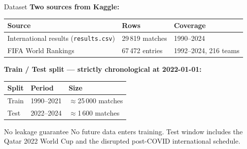 \documentclass[10pt,aspectratio=169]{beamer}
\begin{document}
\begin{frame}{Dataset}
  \textbf{Two sources from Kaggle:}

  \medskip
  \begin{center}
    \begin{tabular}{lll}
      \toprule
      \textbf{Source} & \textbf{Rows} & \textbf{Coverage} \\
      \midrule
      International results (\texttt{results.csv}) & 29\,819 matches & 1990--2024 \\
      FIFA World Rankings & 67\,472 entries & 1992--2024, 216 teams \\
      \bottomrule
    \end{tabular}
  \end{center}

  \medskip
  \textbf{Train / Test split --- strictly chronological at 2022-01-01:}

  \begin{center}
    \begin{tabular}{lll}
      \toprule
      \textbf{Split} & \textbf{Period} & \textbf{Size} \\
      \midrule
      Train & 1990--2021 & $\approx$25\,000 matches \\
      Test  & 2022--2024 & $\approx$1\,600 matches \\
      \bottomrule
    \end{tabular}
  \end{center}

  \begin{alertblock}{No leakage guarantee}
    No future data enters training. Test window includes the Qatar 2022
    World Cup and the disrupted post-COVID international schedule.
  \end{alertblock}
\end{frame}
\end{document}
